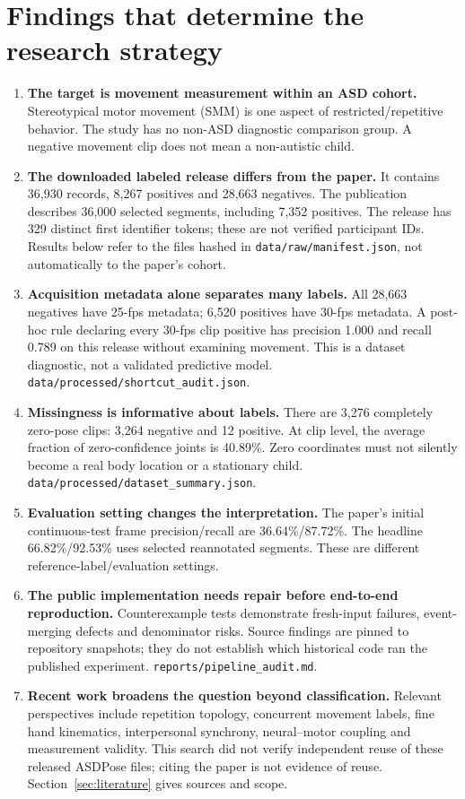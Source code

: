 \documentclass[11pt,a4paper]{article}
\newcommand{\artifact}[1]{\nolinkurl{#1}}
\begin{document}
\section{Findings that determine the research strategy}\label{sec:findings}
\begin{enumerate}[leftmargin=*]
\item \textbf{The target is movement measurement within an ASD cohort.} Stereotypical motor movement (SMM) is one aspect of restricted/repetitive behavior. The study has no non-ASD diagnostic comparison group. A negative movement clip does not mean a non-autistic child. \cite{barami2024}
\item \textbf{The downloaded labeled release differs from the paper.} It contains 36,930 records, 8,267 positives and 28,663 negatives. The publication describes 36,000 selected segments, including 7,352 positives. The release has 329 distinct first identifier tokens; these are not verified participant IDs. Results below refer to the files hashed in \artifact{data/raw/manifest.json}, not automatically to the paper's cohort.
\item \textbf{Acquisition metadata alone separates many labels.} All 28,663 negatives have 25-fps metadata; 6,520 positives have 30-fps metadata. A post-hoc rule declaring every 30-fps clip positive has precision 1.000 and recall 0.789 on this release without examining movement. This is a dataset diagnostic, not a validated predictive model. \artifact{data/processed/shortcut_audit.json}.
\item \textbf{Missingness is informative about labels.} There are 3,276 completely zero-pose clips: 3,264 negative and 12 positive. At clip level, the average fraction of zero-confidence joints is 40.89\%. Zero coordinates must not silently become a real body location or a stationary child. \artifact{data/processed/dataset_summary.json}.
\item \textbf{Evaluation setting changes the interpretation.} The paper's initial continuous-test frame precision/recall are 36.64\%/87.72\%. The headline 66.82\%/92.53\% uses selected reannotated segments. These are different reference-label/evaluation settings. \cite[pp.~5--8]{barami2024}
\item \textbf{The public implementation needs repair before end-to-end reproduction.} Counterexample tests demonstrate fresh-input failures, event-merging defects and denominator risks. Source findings are pinned to repository snapshots; they do not establish which historical code ran the published experiment. \artifact{reports/pipeline_audit.md}.
\item \textbf{Recent work broadens the question beyond classification.} Relevant perspectives include repetition topology, concurrent movement labels, fine hand kinematics, interpersonal synchrony, neural--motor coupling and measurement validity. This search did not verify independent reuse of these released ASDPose files; citing the paper is not evidence of reuse. Section~\ref{sec:literature} gives sources and scope.
\end{enumerate}
\end{document}

